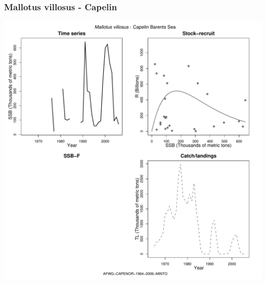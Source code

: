 \subsubsection{Mallotus villosus - Capelin}
\begin{center}
\includegraphics[width=1.2\textwidth]{../R/figures/AFWG-CAPENOR-1964-2006-MINTO.pdf}
\end{center}

